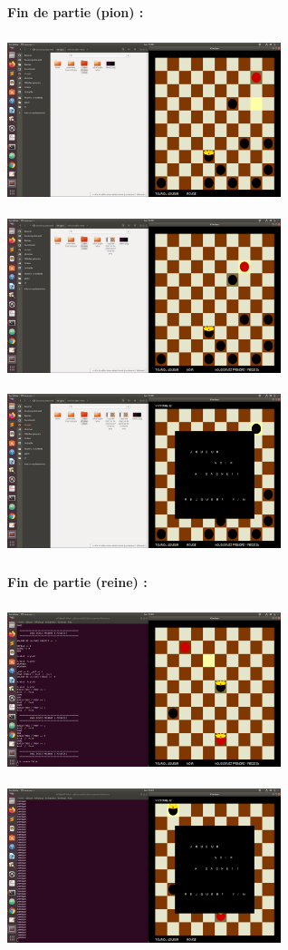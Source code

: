 \documentclass[a4paper]{article}
\begin{document}
\large\bf{Fin de partie (pion) : }
\bigbreak

\includegraphics[width = 8cm, height = 5cm]{Pion.png}
\includegraphics[width = 8cm, height = 5cm]{Pion2.png}
\bigbreak
\includegraphics[width = 8cm, height = 5cm]{Pion3.png}

\bigbreak
\large\bf{Fin de partie (reine) : }
\bigbreak

\includegraphics[width = 8cm, height = 5cm]{Reine.png}
\includegraphics[width = 8cm, height = 5cm]{Reine2.png}
\bigbreak
\end{document}
